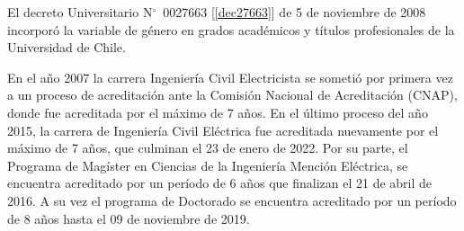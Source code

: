 El decreto Universitario N$^\circ$~0027663 [\ref{dec27663}] de 5 de noviembre de 2008 incorporó la variable de
género en grados académicos y títulos profesionales de la Universidad de Chile.

En el año 2007 la carrera Ingeniería Civil Electricista se sometió por primera vez a un proceso
de acreditación ante la Comisión Nacional de Acreditación (CNAP), donde fue acreditada por el
máximo de 7 años. En el último proceso del año 2015, la carrera de Ingeniería Civil Eléctrica fue
acreditada nuevamente por el máximo de 7 años, que culminan el 23 de enero de 2022. Por su parte,
el Programa de Magíster en Ciencias de la Ingeniería Mención Eléctrica, se encuentra acreditado
por un período de 6 años que finalizan el 21 de abril de 2016. A su vez el programa de Doctorado
se encuentra acreditado por un período de 8 años hasta el 09 de noviembre de 2019.

